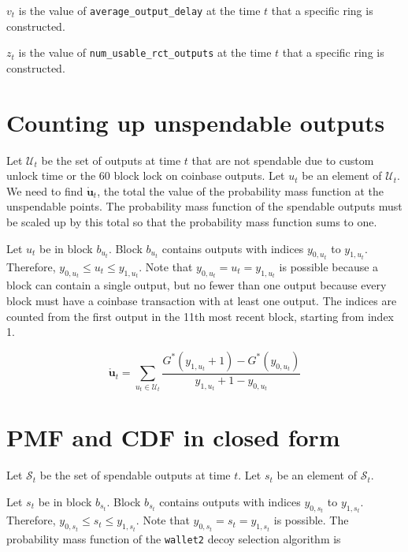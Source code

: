 \documentclass{article}
\begin{document}
$v_{t}$ is the value of \texttt{average\_output\_delay} at the time
$t$ that a specific ring is constructed.

$z_{t}$ is the value of \texttt{num\_usable\_rct\_outputs} at the
time $t$ that a specific ring is constructed.

\section{Counting up unspendable outputs}

Let $\mathcal{U}_{t}$ be the set of outputs at time $t$ that are
not spendable due to custom unlock time or the 60 block lock on coinbase
outputs. Let $u_{t}$ be an element of $\mathcal{U}_{t}$. We need
to find $\mathring{\mathbf{u}}_{t}$, the total the value of the probability
mass function at the unspendable points. The probability mass function
of the spendable outputs must be scaled up by this total so that the
probability mass function sums to one.

Let $u_{t}$ be in block $b_{u_{t}}$. Block $b_{u_{t}}$ contains
outputs with indices $y_{0,u_{t}}$ to $y_{1,u_{t}}$. Therefore,
$y_{0,u_{t}}\leq u_{t}\leq y_{1,u_{t}}$. Note that $y_{0,u_{t}}=u_{t}=y_{1,u_{t}}$
is possible because a block can contain a single output, but no fewer
than one output because every block must have a coinbase transaction
with at least one output. The indices are counted from the first output
in the 11th most recent block, starting from index 1.

\begin{equation}
\mathring{\mathbf{u}}_{t}=\underset{u_{t}\in\mathcal{U}_{t}}{\sum}\dfrac{G^{*}\left(y_{1,u_{t}}+1\right)-G^{*}\left(y_{0,u_{t}}\right)}{y_{1,u_{t}}+1-y_{0,u_{t}}}
\end{equation}


\section{PMF and CDF in closed form}

Let $\mathcal{S}_{t}$ be the set of spendable outputs at time $t$.
Let $s_{t}$ be an element of $\mathcal{S}_{t}$.

Let $s_{t}$ be in block $b_{s_{t}}$. Block $b_{s_{t}}$ contains
outputs with indices $y_{0,s_{t}}$ to $y_{1,s_{t}}$. Therefore,
$y_{0,s_{t}}\leq s_{t}\leq y_{1,s_{t}}$. Note that $y_{0,s_{t}}=s_{t}=y_{1,s_{t}}$
is possible. The probability mass function of the \texttt{wallet2}
decoy selection algorithm is 
\end{document}
